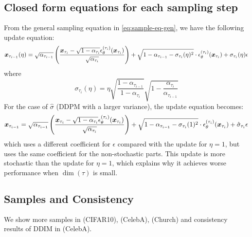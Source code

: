 \subsection{Closed form equations for each sampling step}
\label{app:equations}

From the general sampling equation in \eqref{eq:sample-eq-gen}, we have the following update equation:
\begin{align}
    {\bm{x}}_{\tau_{i-1}}(\eta) = \sqrt{\alpha_{\tau_{i-1}}} \left(\frac{{\bm{x}}_{\tau_{i}} - \sqrt{1 - \alpha_{\tau_i}} \epsilon_\theta^{(\tau_i)}({\bm{x}}_{\tau_{i}})}{\sqrt{\alpha_{\tau_i}}}\right) + \sqrt{1 - \alpha_{\tau_{i-1}} - \sigma_{\tau_i}(\eta)^2} \cdot \epsilon_\theta^{(\tau_i)}({\bm{x}}_{\tau_{i}}) + \sigma_{\tau_i}(\eta) \epsilon \nonumber
\end{align}
where
$$\sigma_{\tau_{i}}(\eta) = \eta \sqrt{\frac{1 - \alpha_{\tau_{i-1}}}{1 - \alpha_{\tau_{i}}}}\sqrt{1 - \frac{\alpha_{\tau_i}}{\alpha_{\tau_{i-1}}}}$$
For the case of $\hat{\sigma}$ (DDPM with a larger variance), the update equation becomes:
\begin{align}
    {\bm{x}}_{\tau_{i-1}} = \sqrt{\alpha_{\tau_{i-1}}} \left(\frac{{\bm{x}}_{\tau_{i}} - \sqrt{1 - \alpha_{\tau_i}} \epsilon_\theta^{(\tau_i)}({\bm{x}}_{\tau_{i}})}{\sqrt{\alpha_{\tau_i}}}\right) + \sqrt{1 - \alpha_{\tau_{i-1}} - \sigma_{\tau_i}(1)^2} \cdot \epsilon_\theta^{(\tau_i)}({\bm{x}}_{\tau_{i}}) + \hat{\sigma}_{\tau_{i}} \epsilon \nonumber
\end{align}
which uses a different coefficient for $\epsilon$ compared with the update for $\eta = 1$, but uses the same coefficient for the non-stochastic parts. This update is more stochastic than the update for $\eta = 1$, which explains why it achieves worse performance when $\dim(\tau)$ is small.





\subsection{Samples and Consistency}
\label{app:samples}

We show more samples in  (CIFAR10),  (CelebA),  (Church) and consistency results of DDIM in  (CelebA).

